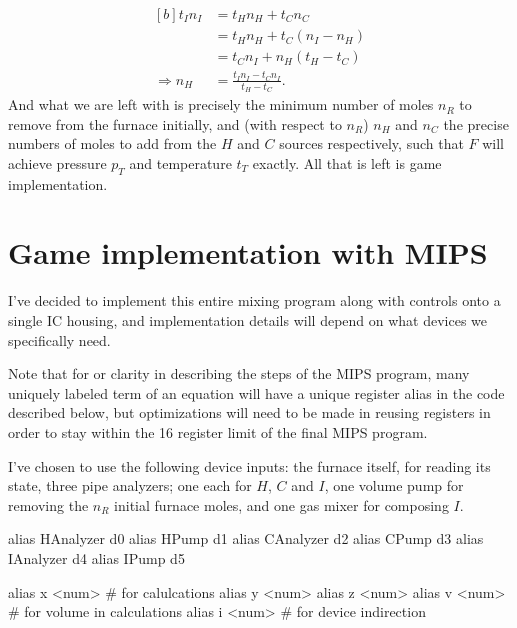 \documentclass{article}
\begin{document}
\begin{equation}\label{eq:nH}
    \begin{aligned}[b]
        t_I n_I
        &= t_H n_H+t_C n_C \\
        &= t_H n_H+t_C(n_I-n_H) \\
        &= t_C n_I+n_H(t_H-t_C) \\
        \Rightarrow n_H &= \frac{t_I n_I-t_C n_I}{t_H-t_C}.
    \end{aligned}
\end{equation}
And what we are left with is precisely the minimum number of moles $n_R$ to
remove from the furnace initially, and (with respect to $n_R$) $n_H$ and $n_C$
the precise numbers of moles to add from the $H$ and $C$ sources respectively,
such that $F$ will achieve pressure $p_T$ and temperature $t_T$ exactly.
All that is left is game implementation.

\section{Game implementation with MIPS}

I've decided to implement this entire mixing program along with controls onto a
single IC housing, and implementation details will depend on what devices we
specifically need.

Note that for or clarity in describing the steps of the MIPS program,
many uniquely labeled term of an equation will have a unique register alias
in the code described below, but optimizations will need to be made in
reusing registers in order to stay within the 16 register limit of the
final MIPS program.
\vspace{1em}
\begin{paracol}{2}
    \noindent
    I've chosen to use the following device inputs:
    the furnace itself, for reading its state,
    three pipe analyzers; one each for $H$, $C$ and $I$,
    one volume pump for removing the $n_R$ initial furnace moles, and
    one gas mixer for composing $I$.
    \switchcolumn
    \vspace{-1em}
    \begin{mips}
        alias HAnalyzer d0
        alias HPump d1
        alias CAnalyzer d2
        alias CPump d3
        alias IAnalyzer d4
        alias IPump d5

        alias x <num> # for calulcations
        alias y <num>
        alias z <num>
        alias v <num> # for volume in calculations
        alias i <num> # for device indirection
    \end{mips}
\end{paracol}
\end{document}

